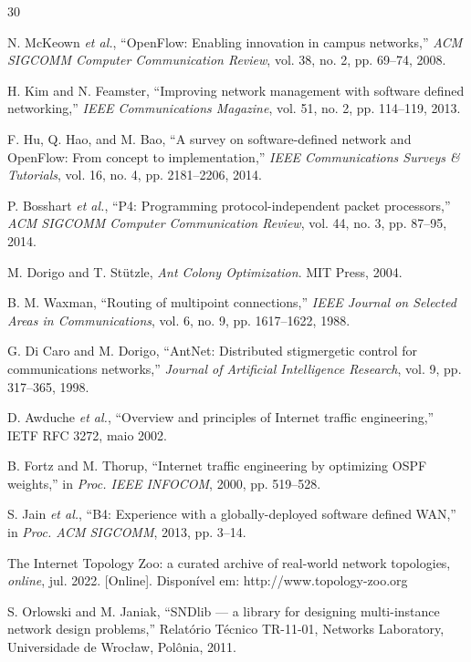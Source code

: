 \documentclass[journal]{IEEEtran}
\begin{document}
\begin{thebibliography}{30}

 N. McKeown \emph{et al.}, ``OpenFlow: Enabling
innovation in campus networks,'' \emph{ACM SIGCOMM Computer Communication
Review}, vol. 38, no. 2, pp. 69--74, 2008.

 H. Kim and N. Feamster, ``Improving network management with
software defined networking,'' \emph{IEEE Communications Magazine}, vol. 51,
no. 2, pp. 114--119, 2013.

 F. Hu, Q. Hao, and M. Bao, ``A survey on software-defined
network and OpenFlow: From concept to implementation,'' \emph{IEEE
Communications Surveys \& Tutorials}, vol. 16, no. 4, pp. 2181--2206, 2014.

 P. Bosshart \emph{et al.}, ``P4: Programming
protocol-independent packet processors,'' \emph{ACM SIGCOMM Computer
Communication Review}, vol. 44, no. 3, pp. 87--95, 2014.

 M. Dorigo and T. St\"utzle, \emph{Ant Colony
Optimization}. MIT Press, 2004.

 B. M. Waxman, ``Routing of multipoint connections,''
\emph{IEEE Journal on Selected Areas in Communications}, vol. 6, no. 9,
pp. 1617--1622, 1988.

 G. Di Caro and M. Dorigo, ``AntNet: Distributed
stigmergetic control for communications networks,'' \emph{Journal of
Artificial Intelligence Research}, vol. 9, pp. 317--365, 1998.

 D. Awduche \emph{et al.}, ``Overview and principles of
Internet traffic engineering,'' IETF RFC 3272, maio 2002.

 B. Fortz and M. Thorup, ``Internet traffic engineering by
optimizing OSPF weights,'' in \emph{Proc. IEEE INFOCOM}, 2000,
pp. 519--528.

 S. Jain \emph{et al.}, ``B4: Experience with a
globally-deployed software defined WAN,'' in \emph{Proc. ACM SIGCOMM},
2013, pp. 3--14.

 The Internet Topology Zoo: a curated archive of real-world
network topologies, \emph{online}, jul. 2022. [Online]. Disponível em:
http://www.topology-zoo.org

 S. Orlowski and M. Janiak, ``SNDlib --- a library for
designing multi-instance network design problems,'' Relatório Técnico
TR-11-01, Networks Laboratory, Universidade de Wroc\l aw, Polônia, 2011.


\end{thebibliography}
\end{document}
